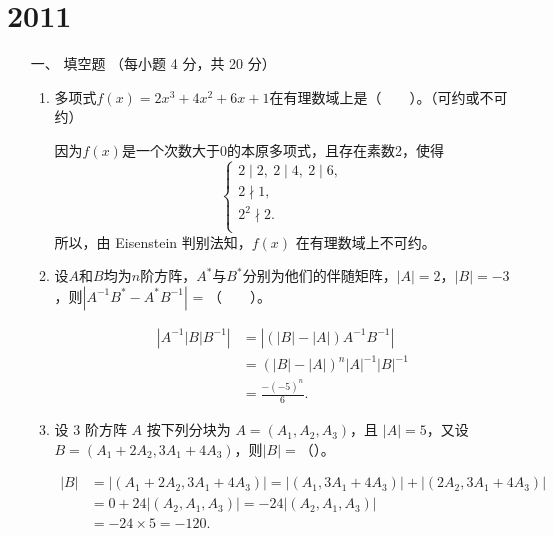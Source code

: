 \section{2011}
\begin{enumerate}[1~]
\renewcommand{\labelenumi}{\textbf{\theenumi. }}
\renewcommand{\Im}{\text{Im }}

\item[一、]
填空题 （每小题 4 分，共 20 分）
\begin{enumerate}[1.~]
\item
多项式$f(x) = 2x^3 +4x^2 +6x+1$在有理数域上是（\ \ \ \ ）。（可约或不可约）
\begin{solution}
因为$f(x)$是一个次数大于0的本原多项式，且存在素数2，使得\[
\left\{ \begin{array}{l}
	2\mid 2,\ 2\mid 4,\ 2\mid 6,\\
	2\nmid 1,\\
	2^2\nmid 2.\\
\end{array} \right.  \]
所以，由 Eisenstein 判别法知，$f(x)$ 在有理数域上不可约。
\end{solution}

\item
设$A$和$B$均为$n$阶方阵，$A^*$与$B^*$分别为他们的伴随矩阵，$|A|=2$，$|B| = -3$，则$|A^{-1}B^* -A^*B^{-1}|$ = （\ \ \ \ ）。
\begin{solution}
\begin{align*}
\left| A^{-1} \left|B\right| B^{-1} \right| &= \left| \left( \left|B \right| - \left|A \right| \right) A^{-1} B^{-1}\right|\\  &=\left( \left|B \right| -\left|A \right| \right)^n \left|A \right|^{-1}\left|B \right|^{-1} \\ &=\frac{-\left( -5 \right)^n}{6}.
\end{align*}
\end{solution}

\item
设 $3$ 阶方阵 $A$ 按下列分块为 $A=(A_1, A_2, A_3)$，且 $|A|=5$，又设 $B=(A_1+2A_2, 3A_1+4 A_3)$，则$|B|=$（\quad）。
\begin{solution}
\begin{align*}
|B|&=|(A_1+2A_2, 3A_1+4 A_3)|=|(A_1, 3A_1+4 A_3)|+|(2A_2, 3A_1+4 A_3)|\\
&=0+24 |(A_2, A_1, A_3)|=-24 |(A_2, A_1, A_3)|\\
&=-24\times 5=-120.
\end{align*}
\end{solution}


\end{enumerate}
\end{enumerate}
